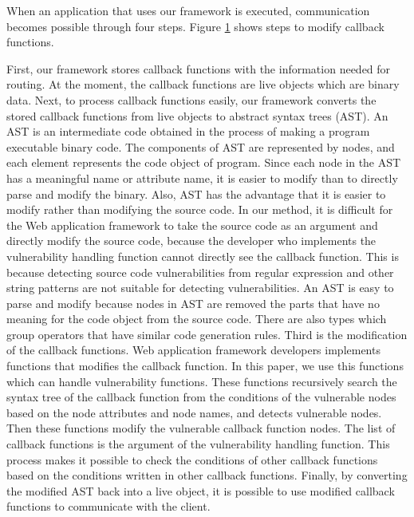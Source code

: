 \documentclass[conference]{IEEEtran}
\begin{document}
When an application that uses our framework is executed, communication becomes possible through four steps.
Figure \ref{fig:4step} shows steps to modify callback functions.
\begin{figure}[htbp]
\label{fig:4step}
\end{figure}
First, our framework stores callback functions with the information needed for routing.
At the moment, the callback functions are live objects which are binary data.
Next, to process callback functions easily, our framework converts the stored callback functions from live objects to abstract syntax trees (AST).
An AST is an intermediate code obtained in the process of making a program executable binary code.
The components of AST are represented by nodes, and each element represents the code object of program.
Since each node in the AST has a meaningful name or attribute name, it is easier to modify than to directly parse and modify the binary.
Also, AST has the advantage that it is easier to modify rather than modifying the source code.
In our method, it is difficult for the Web application framework to take the source code as an argument and directly modify the source code, because the developer who implements the vulnerability handling function cannot directly see the callback function.
This is because detecting source code vulnerabilities from regular expression and other string patterns are not suitable for detecting vulnerabilities.
An AST is easy to parse and modify because nodes in AST are removed the parts that have no meaning for the code object from the source code.
There are also types which group operators that have similar code generation rules.
Third is the modification of the callback functions.
Web application framework developers implements functions that modifies the callback function.
In this paper, we use this functions which can handle vulnerability functions.
These functions recursively search the syntax tree of the callback function from the conditions of the vulnerable nodes based on the node attributes and node names, and detects vulnerable nodes.
Then these functions modify the vulnerable callback function nodes.
The list of callback functions is the argument of the vulnerability handling function.
This process makes it possible to check the conditions of other callback functions based on the conditions written in other callback functions.
Finally, by converting the modified AST back into a live object, it is possible to use modified callback functions to communicate with the client.
\end{document}
